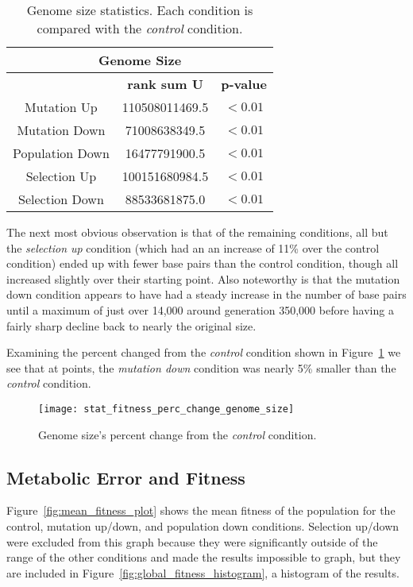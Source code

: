 \begin{table}[H]
	\centering
	\begin{tabular}{|c|c|c|}
		\hline
		\multicolumn{3}{c}{\Large Genome Size} \\
		\hline
		 & \textbf{rank sum U} & \textbf{p-value} \\
		\hline \hline
		Mutation Up & 110508011469.5 & $< 0.01$ \\
		\hline
		Mutation Down & 71008638349.5 & $< 0.01$ \\
		\hline
		Population Down & 16477791900.5 & $< 0.01$ \\
		\hline
		Selection Up & 100151680984.5 & $< 0.01$ \\
		\hline
		Selection Down & 88533681875.0 & $< 0.01$ \\
		\hline
	\end{tabular}
	\caption[Genome size statistics]{Genome size statistics. Each condition is compared with the \textit{control} condition.}
	\label{table:genome_size_stats}
\end{table} 

The next most obvious observation is that of the remaining conditions, all but the \textit{selection up} condition (which had an an increase of 11\% over the control condition) ended up with fewer base pairs than the control condition, though all increased slightly over their starting point. Also noteworthy is that the mutation down condition appears to have had a steady increase in the number of base pairs until a maximum of just over 14,000 around generation 350,000 before having a fairly sharp decline back to nearly the original size. 

Examining the percent changed from the \textit{control} condition shown in Figure~\ref{fig:genome_size_percent_change} we see that at points, the \textit{mutation down} condition was nearly 5\% smaller than the \textit{control} condition. 

\begin{figure}[H]
	\centering
	\texttt{[image: stat\_fitness\_perc\_change\_genome\_size]}
	\caption[Genome size - percent change]{Genome size's percent change from the \textit{control} condition.}
	\label{fig:genome_size_percent_change}
\end{figure}

\subsection{Metabolic Error and Fitness}
Figure~\ref{fig:mean_fitness_plot} shows the mean fitness of the population for the control, mutation up/down, and population down conditions. Selection up/down were excluded from this graph because they were significantly outside of the range of the other conditions and made the results impossible to graph, but they are included in Figure~\ref{fig:global_fitness_histogram}, a histogram of the results.

